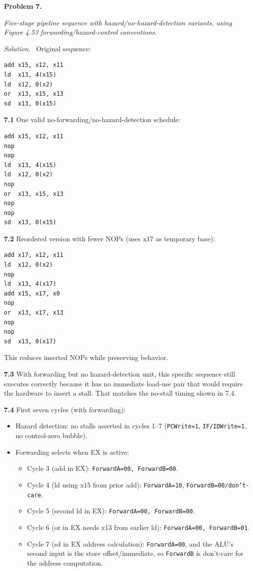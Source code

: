 \documentclass[12pt]{article}
\newcommand{\problem}[1]{\vspace{0.8em}\noindent\textbf{Problem #1.}\vspace{0.35em}}
\newenvironment{solution}{\par\noindent\textit{Solution.}\ }{\par\vspace{1.1em}}
\newcommand{\subproblem}[1]{\par\vspace{0.45em}\noindent\textbf{#1}\quad}
\newcommand{\assigntext}[1]{\par\vspace{0.25em}\small\textit{#1}\par\vspace{0.35em}}
\begin{document}
\problem{7}
\assigntext{Five-stage pipeline sequence with hazard/no-hazard-detection variants, using Figure 4.53 forwarding/hazard-control conventions.}

\begin{solution}
Original sequence:
\begin{verbatim}
add x15, x12, x11
ld  x13, 4(x15)
ld  x12, 0(x2)
or  x13, x15, x13
sd  x13, 0(x15)
\end{verbatim}

\subproblem{7.1}
One valid no-forwarding/no-hazard-detection schedule:
\begin{verbatim}
add x15, x12, x11
nop
nop
ld  x13, 4(x15)
ld  x12, 0(x2)
nop
or  x13, x15, x13
nop
nop
sd  x13, 0(x15)
\end{verbatim}

\subproblem{7.2}
Reordered version with fewer NOPs (uses x17 as temporary base):
\begin{verbatim}
add x17, x12, x11
ld  x12, 0(x2)
nop
ld  x13, 4(x17)
add x15, x17, x0
nop
or  x13, x17, x13
nop
nop
sd  x13, 0(x17)
\end{verbatim}
This reduces inserted NOPs while preserving behavior.

\subproblem{7.3}
With forwarding but no hazard-detection unit, this specific sequence still executes correctly because it has no immediate load-use pair that would require the hardware to insert a stall. That matches the no-stall timing shown in 7.4.

\subproblem{7.4}
First seven cycles (with forwarding):
\begin{itemize}
\item Hazard detection: no stalls asserted in cycles 1--7 (\texttt{PCWrite=1}, \texttt{IF/IDWrite=1}, no control-zero bubble).
\item Forwarding selects when EX is active:
\begin{itemize}
\item Cycle 3 (add in EX): \texttt{ForwardA=00, ForwardB=00}.
\item Cycle 4 (ld using x15 from prior add): \texttt{ForwardA=10}, \texttt{ForwardB=00/don't-care}.
\item Cycle 5 (second ld in EX): \texttt{ForwardA=00, ForwardB=00}.
\item Cycle 6 (or in EX needs x13 from earlier ld): \texttt{ForwardA=00, ForwardB=01}.
\item Cycle 7 (sd in EX address calculation): \texttt{ForwardA=00}, and the ALU's second input is the store offset/immediate, so \texttt{ForwardB} is don't-care for the address computation.
\end{itemize}
\end{itemize}


\end{solution}
\end{document}

